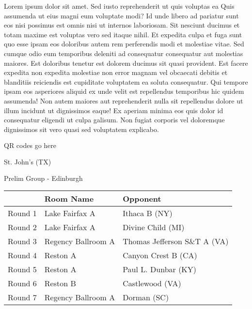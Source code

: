 \documentclass{article}%
\begin{document}
\vspace*{8pt}%
\linebreak%
\newline%
\newline%
Lorem ipsum dolor sit amet. Sed iusto reprehenderit ut quis voluptas ea Quis assumenda ut eius magni eum voluptate modi? Id unde libero ad pariatur sunt eos nisi possimus est omnis nisi ut internos laboriosam. Sit nesciunt ducimus et totam maxime est voluptas vero sed itaque nihil. Et expedita culpa et fuga sunt quo esse ipsam eos doloribus autem rem perferendis modi et molestiae vitae.\newline%
\newline%
Sed cumque odio eum temporibus deleniti ad consequatur consequatur aut molestias maiores. Est doloribus tenetur est dolorem ducimus sit quasi provident. Est facere expedita non expedita molestiae non error magnam vel obcaecati debitis et blanditiis reiciendis est cupiditate voluptatem ea soluta consequatur. Qui tempore ipsam eos asperiores aliquid ex unde velit est repellendus temporibus hic quidem assumenda!\newline%
\newline%
Non autem maiores aut reprehenderit nulla sit repellendus dolore ut illum incidunt ut dignissimos eaque! Ex aperiam minima eos quis dolor id consequatur eligendi ut culpa galisum. Non fugiat corporis vel doloremque dignissimos sit vero quasi sed voluptatem explicabo.\newline%
\newline%
%
\vspace*{30pt}%
\begin{center}%
\begin{Huge}%
QR codes go here%
\end{Huge}%
\end{center}%
\newpage%
%
\begin{center}%
\begin{Huge}%
St. John's (TX)%
\end{Huge}%
\vspace*{8pt}%
\linebreak%
\begin{Large}%
Prelim Group {-} Edinburgh%
\end{Large}%
\end{center}%
\begin{tabularx}{\textwidth}{|c|Y|Y|}%
\hline%
&Room Name&Opponent\\%
\hline%
Round 1&Lake Fairfax A&Ithaca B (NY)\\%
Round 2&Lake Fairfax A&Divine Child (MI)\\%
Round 3&Regency Ballroom A&Thomas Jefferson S\&T A (VA)\\%
Round 4&Reston A&Canyon Crest B (CA)\\%
Round 5&Reston A&Paul L. Dunbar (KY)\\%
Round 6&Reston B&Castlewood (VA)\\%
Round 7&Regency Ballroom A&Dorman (SC)\\%
\hline%
\end{tabularx}%
\end{document}
